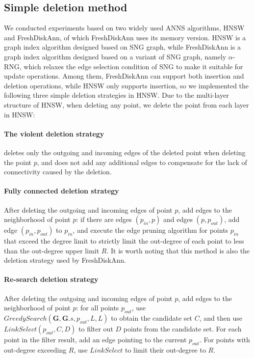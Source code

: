 \subsection{Simple deletion method}
We conducted experiments based on two widely used ANNS algorithms, HNSW and FreshDiskAnn, of which FreshDiskAnn uses its memory version. HNSW is a graph index algorithm designed based on SNG graph, while FreshDiskAnn is a graph index algorithm designed based on a variant of SNG graph, namely $\alpha$-RNG, which relaxes the edge selection condition of SNG to make it suitable for update operations. Among them, FreshDiskAnn can support both insertion and deletion operations, while HNSW only supports insertion, so we implemented the following three simple deletion strategies in HNSW. Due to the multi-layer structure of HNSW, when deleting any point, we delete the point from each layer in HNSW:

\paragraph{\textbf{The violent deletion strategy}} deletes only the outgoing and incoming edges of the deleted point when deleting the point $p$, and does not add any additional edges to compensate for the lack of connectivity caused by the deletion.

\paragraph{\textbf{Fully connected deletion strategy}}After deleting the outgoing and incoming edges of point $p$, add edges to the neighborhood of point $p$: if there are edges $(p_{in},p)$ and edges $(p,p_{out})$, add edge $(p_{in},p_{out})$ to $p_{in}$, and execute the edge pruning algorithm for points $p_{in}$ that exceed the degree limit to strictly limit the out-degree of each point to less than the out-degree upper limit $R$. It is worth noting that this method is also the deletion strategy used by FreshDiskAnn.

\paragraph{\textbf{Re-search deletion strategy}}After deleting the outgoing and incoming edges of point $p$, add edges to the neighborhood of point $p$: for all points $p_{out}$, use $GreedySearch(\mathbf{G},\mathbf{G}.s,p_{out},L,L)$ to obtain the candidate set $C$, and then use $LinkSelect(p_{out},C,D)$ to filter out $D$ points from the candidate set. For each point in the filter result, add an edge pointing to the current $p_{out}$. For points with out-degree exceeding $R$, use $LinkSelect$ to limit their out-degree to $R$.

